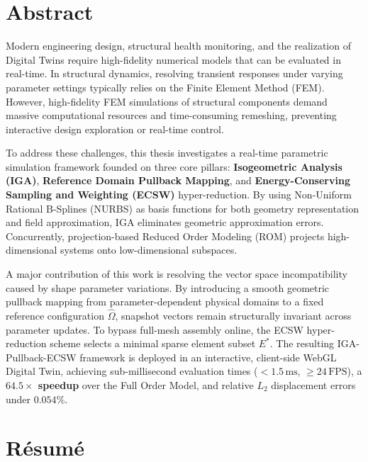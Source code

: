 \chapter*{Abstract}

Modern engineering design, structural health monitoring, and the realization of Digital Twins require high-fidelity numerical models that can be evaluated in real-time. In structural dynamics, resolving transient responses under varying parameter settings typically relies on the Finite Element Method (FEM). However, high-fidelity FEM simulations of structural components demand massive computational resources and time-consuming remeshing, preventing interactive design exploration or real-time control.

To address these challenges, this thesis investigates a real-time parametric simulation framework founded on three core pillars: \textbf{Isogeometric Analysis (IGA)}, \textbf{Reference Domain Pullback Mapping}, and \textbf{Energy-Conserving Sampling and Weighting (ECSW)} hyper-reduction. By using Non-Uniform Rational B-Splines (NURBS) as basis functions for both geometry representation and field approximation, IGA eliminates geometric approximation errors. Concurrently, projection-based Reduced Order Modeling (ROM) projects high-dimensional systems onto low-dimensional subspaces.

A major contribution of this work is resolving the vector space incompatibility caused by shape parameter variations. By introducing a smooth geometric pullback mapping from parameter-dependent physical domains to a fixed reference configuration $\hat{\Omega}$, snapshot vectors remain structurally invariant across parameter updates. To bypass full-mesh assembly online, the ECSW hyper-reduction scheme selects a minimal sparse element subset $E^*$. The resulting IGA-Pullback-ECSW framework is deployed in an interactive, client-side WebGL Digital Twin, achieving sub-millisecond evaluation times ($<1.5\,\text{ms}$, $\ge 24\,\text{FPS}$), a \textbf{$\mathbf{64.5\times}$ speedup} over the Full Order Model, and relative $L_2$ displacement errors under $0.054\%$.

\vspace{1.5cm}

\chapter*{Résumé}

